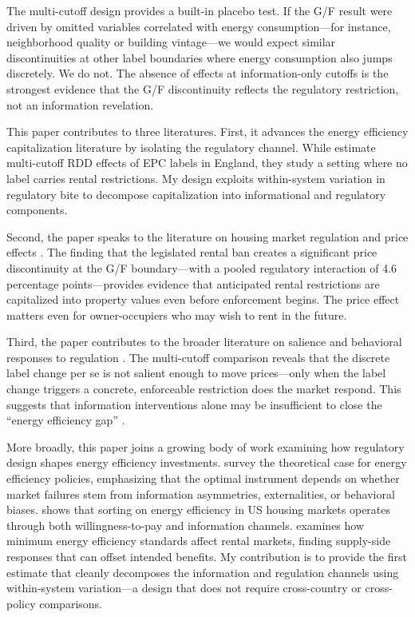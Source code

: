 \documentclass[12pt]{article}
\begin{document}
The multi-cutoff design provides a built-in placebo test. If the G/F result were driven by omitted variables correlated with energy consumption---for instance, neighborhood quality or building vintage---we would expect similar discontinuities at other label boundaries where energy consumption also jumps discretely. We do not. The absence of effects at information-only cutoffs is the strongest evidence that the G/F discontinuity reflects the regulatory restriction, not an information revelation.

This paper contributes to three literatures. First, it advances the energy efficiency capitalization literature \citep{eichholtz2010doing, brounen2012energy, sejas2025epc} by isolating the regulatory channel. While \citet{sejas2025epc} estimate multi-cutoff RDD effects of EPC labels in England, they study a setting where no label carries rental restrictions. My design exploits within-system variation in regulatory bite to decompose capitalization into informational and regulatory components.

Second, the paper speaks to the literature on housing market regulation and price effects \citep{davis2021contribution, diamond2019effect}. The finding that the legislated rental ban creates a significant price discontinuity at the G/F boundary---with a pooled regulatory interaction of 4.6 percentage points---provides evidence that anticipated rental restrictions are capitalized into property values even before enforcement begins. The price effect matters even for owner-occupiers who may wish to rent in the future.

Third, the paper contributes to the broader literature on salience and behavioral responses to regulation \citep{chetty2009salience, kleven2013using, sallee2014rational}. The multi-cutoff comparison reveals that the discrete label change per se is not salient enough to move prices---only when the label change triggers a concrete, enforceable restriction does the market respond. This suggests that information interventions alone may be insufficient to close the ``energy efficiency gap'' \citep{allcott2014short, gerarden2017assessing}.

More broadly, this paper joins a growing body of work examining how regulatory design shapes energy efficiency investments. \citet{gillingham2012energy} survey the theoretical case for energy efficiency policies, emphasizing that the optimal instrument depends on whether market failures stem from information asymmetries, externalities, or behavioral biases. \citet{myers2022sorting} shows that sorting on energy efficiency in US housing markets operates through both willingness-to-pay and information channels. \citet{braga2024rental} examines how minimum energy efficiency standards affect rental markets, finding supply-side responses that can offset intended benefits. My contribution is to provide the first estimate that cleanly decomposes the information and regulation channels using within-system variation---a design that does not require cross-country or cross-policy comparisons.
\end{document}
